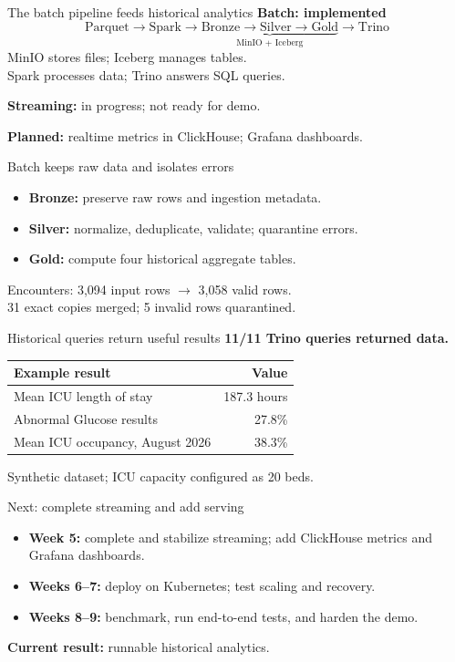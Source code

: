 \documentclass{beamer}
\begin{document}
\begin{frame}{The batch pipeline feeds historical analytics}
  \textbf{Batch: implemented}
  \[
    \text{Parquet} \to \text{Spark} \to
    \underbrace{\text{Bronze} \to \text{Silver} \to \text{Gold}}_{\text{MinIO + Iceberg}}
    \to \text{Trino}
  \]
  \medskip
  MinIO stores files; Iceberg manages tables.\\
  Spark processes data; Trino answers SQL queries.
  \bigskip

  \textbf{Streaming:} in progress; not ready for demo.
  \medskip

  \textbf{Planned:} realtime metrics in ClickHouse; Grafana dashboards.
\end{frame}

\begin{frame}{Batch keeps raw data and isolates errors}
  \begin{itemize}
    \item \textbf{Bronze:} preserve raw rows and ingestion metadata.
    \item \textbf{Silver:} normalize, deduplicate, validate; quarantine errors.
    \item \textbf{Gold:} compute four historical aggregate tables.
  \end{itemize}
  \bigskip
  Encounters: 3,094 input rows $\to$ 3,058 valid rows.\\
  31 exact copies merged; 5 invalid rows quarantined.
\end{frame}

\begin{frame}{Historical queries return useful results}
  \textbf{11/11 Trino queries returned data.}\par
  \bigskip
  \begin{tabular}{lr}
    \toprule
    \textbf{Example result} & \textbf{Value} \\
    \midrule
    Mean ICU length of stay & 187.3 hours \\
    Abnormal Glucose results & 27.8\% \\
    Mean ICU occupancy, August 2026 & 38.3\% \\
    \bottomrule
  \end{tabular}
  \bigskip

  Synthetic dataset; ICU capacity configured as 20 beds.
\end{frame}

\begin{frame}{Next: complete streaming and add serving}
  \begin{itemize}
    \item \textbf{Week 5:} complete and stabilize streaming; add ClickHouse metrics and Grafana dashboards.
    \item \textbf{Weeks 6--7:} deploy on Kubernetes; test scaling and recovery.
    \item \textbf{Weeks 8--9:} benchmark, run end-to-end tests, and harden the demo.
  \end{itemize}
  \bigskip
  \textbf{Current result:} runnable historical analytics.
\end{frame}
\end{document}
